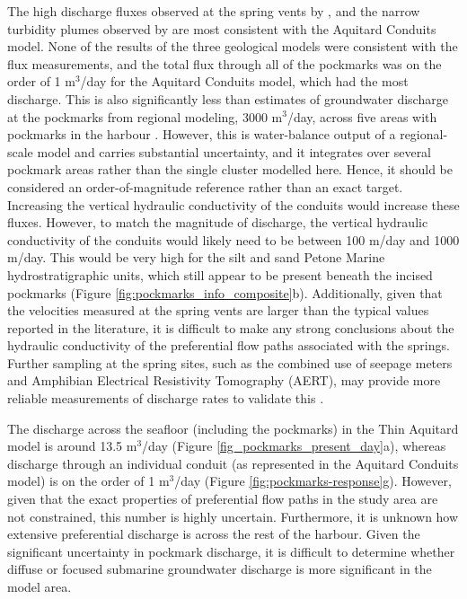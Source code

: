 \documentclass[pdflatex,sn-apa]{sn-jnl}%
\begin{document}
The high discharge fluxes observed at the spring vents by \cite{harding_characteristics_2000}, and the narrow turbidity plumes observed by \cite{hoffmann_fresh_2023} are most consistent with the Aquitard Conduits model.
None of the results of the three geological models were consistent with the flux measurements, and the total flux through all of the pockmarks was on the order of 1 m$^3$/day for the Aquitard Conduits model, which had the most discharge.
This is also significantly less than estimates of groundwater discharge at the pockmarks from regional modeling, 3000 m$^3$/day, across five areas with pockmarks in the harbour \citep{bennett_hutt_2024}.
However, this is water-balance output of a regional-scale model and carries substantial uncertainty, and it integrates over several pockmark areas rather than the single cluster modelled here.
Hence, it should be considered an order-of-magnitude reference rather than an exact target.
Increasing the vertical hydraulic conductivity of the conduits would increase these fluxes.
However, to match the magnitude of discharge, the vertical hydraulic conductivity of the conduits would likely need to be between 100 m/day and 1000 m/day.
This would be very high for the silt and sand Petone Marine hydrostratigraphic units, which still appear to be present beneath the incised pockmarks (Figure \ref{fig:pockmarks_info_composite}b).
Additionally, given that the velocities measured at the spring vents are larger than the typical values reported in the literature, it is difficult to make any strong conclusions about the hydraulic conductivity of the preferential flow paths associated with the springs.
Further sampling at the spring sites, such as the combined use of seepage meters and Amphibian Electrical Resistivity Tomography (AERT), may provide more reliable measurements of discharge rates to validate this \citep{diego-feliu_combining_2025}.

The discharge across the seafloor (including the pockmarks) in the Thin Aquitard model is around 13.5 m$^3$/day (Figure \ref{fig_pockmarks_present_day}a),
whereas discharge through an individual conduit (as represented in the Aquitard Conduits model) is on the order of 1 m$^3$/day (Figure \ref{fig:pockmarks-response}g).
However, given that the exact properties of preferential flow paths in the study area are not constrained, this number is highly uncertain.
Furthermore, it is unknown how extensive preferential discharge is across the rest of the harbour.
Given the significant uncertainty in pockmark discharge, it is difficult to determine whether diffuse or focused submarine groundwater discharge is more significant in the model area.
\end{document}
